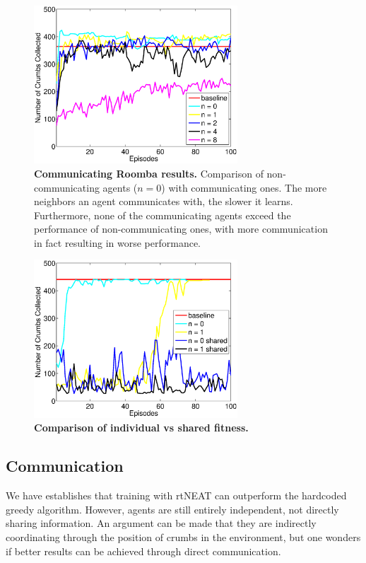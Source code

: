 \documentclass[conference]{IEEEtran}
\begin{document}
\begin{figure}[t]
\centering
\includegraphics[width=3.0in]{./figures/neroevolution/comm_result.eps}
\caption{\textbf{Communicating Roomba results.} Comparison of non-communicating agents ($n=0$) with communicating ones. The more neighbors an agent communicates with, the slower it learns. Furthermore, none of the communicating agents exceed the performance of non-communicating ones, with more communication in fact resulting in worse performance. }
\label{neroevolution:communication_results}
\end{figure}

\begin{figure}[t]
\centering
\includegraphics[width=3.0in]{./figures/neroevolution/shared_result.eps}
\caption{\textbf{Comparison of individual vs shared fitness.}}
\label{neroevolution:shared_fitness}
\end{figure}



\subsection{Communication}


We have establishes that training with rtNEAT can outperform the hardcoded greedy algorithm. However, agents are still entirely independent, not directly sharing information. An argument can be made that they are indirectly coordinating through the position of crumbs in the environment, but one wonders if better results can be achieved through direct communication.
\end{document}
